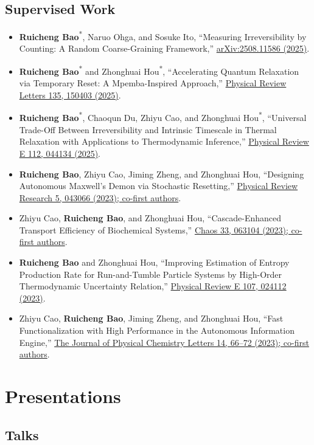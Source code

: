 \documentclass[10pt,a4paper]{article}
\newcommand{\pub}[4]{%
  \item #1, ``#2,'' \href{#4}{#3}.
}
\newcommand{\corr}[1]{#1\textsuperscript{*}}
\begin{document}
\newpage
\subsection{Supervised Work}

\begin{itemize}
  \pub{\corr{\textbf{Ruicheng Bao}}, Naruo Ohga, and Sosuke Ito}{Measuring Irreversibility by Counting: A Random Coarse-Graining Framework}{arXiv:2508.11586 (2025)}{https://arxiv.org/abs/2508.11586}
  \pub{\corr{\textbf{Ruicheng Bao}} and \corr{Zhonghuai Hou}}{Accelerating Quantum Relaxation via Temporary Reset: A Mpemba-Inspired Approach}{Physical Review Letters 135, 150403 (2025)}{https://doi.org/10.1103/g94p-7421}
  \pub{\corr{\textbf{Ruicheng Bao}}, Chaoqun Du, Zhiyu Cao, and \corr{Zhonghuai Hou}}{Universal Trade-Off Between Irreversibility and Intrinsic Timescale in Thermal Relaxation with Applications to Thermodynamic Inference}{Physical Review E 112, 044134 (2025)}{https://doi.org/10.1103/fmsz-rdbj}
  \pub{\textbf{Ruicheng Bao}, Zhiyu Cao, Jiming Zheng, and Zhonghuai Hou}{Designing Autonomous Maxwell's Demon via Stochastic Resetting}{Physical Review Research 5, 043066 (2023); co-first authors}{https://doi.org/10.1103/PhysRevResearch.5.043066}
  \pub{Zhiyu Cao, \textbf{Ruicheng Bao}, and Zhonghuai Hou}{Cascade-Enhanced Transport Efficiency of Biochemical Systems}{Chaos 33, 063104 (2023); co-first authors}{https://doi.org/10.1063/5.0146769}
  \pub{\textbf{Ruicheng Bao} and Zhonghuai Hou}{Improving Estimation of Entropy Production Rate for Run-and-Tumble Particle Systems by High-Order Thermodynamic Uncertainty Relation}{Physical Review E 107, 024112 (2023)}{https://doi.org/10.1103/PhysRevE.107.024112}
  \pub{Zhiyu Cao, \textbf{Ruicheng Bao}, Jiming Zheng, and Zhonghuai Hou}{Fast Functionalization with High Performance in the Autonomous Information Engine}{The Journal of Physical Chemistry Letters 14, 66--72 (2023); co-first authors}{https://doi.org/10.1021/acs.jpclett.2c03335}
\end{itemize}

\section{Presentations}

\subsection{Talks}
\end{document}
